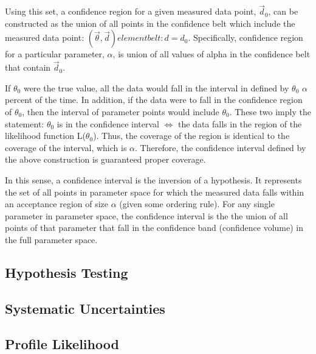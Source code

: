 Using this set, a confidence region for a given measured data point, $\vec{d}_0$, can be constructed as the union of all points in the confidence belt which include the measured data point: ${ ( \vec{ \theta }, \vec{d}) element belt : d = d_{0}}$.
Specifically, confidence region for a particular parameter, $\alpha$, is union of all values of alpha in the confidence belt that contain $\vec{d}_0$.

If $\theta_0$ were the true value, all the data would fall in the interval in defined by $\theta_0$ $\alpha$ percent of the time.
In addition, if the data were to fall in the confidence region of $\theta_0$, then the interval of parameter points would include $\theta_0$.
These two imply the statement: $\theta_0$ is in the confidence interval $\iff$ the data falls in the region of the likelihood function L($\theta_0$).
Thus, the coverage of the region is identical to the coverage of the interval, which is $\alpha$.
Therefore, the confidence interval defined by the above construction is guaranteed proper coverage.

In this sense, a confidence interval is the inversion of a hypothesis.
It represents the set of all points in parameter space for which the measured data falls within an acceptance region of size $\alpha$ (given some ordering rule).
For any single parameter in parameter space, the confidence interval is the the union of all points of that parameter that fall in the confidence band (confidence volume) in the full parameter space.


\subsection{Hypothesis Testing}

\subsection{Systematic Uncertainties}



\subsection{Profile Likelihood}


